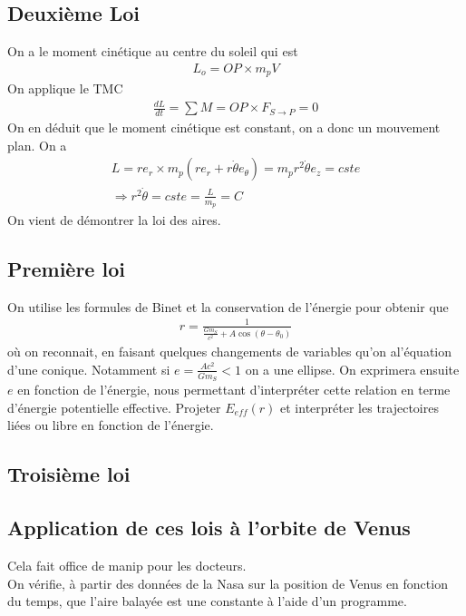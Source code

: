 \documentclass[12pt,prb,aps,epsf]{article}
\begin{document}
\subsection{Deuxième Loi}
On a le moment cinétique au centre du soleil qui est 
\begin{eqnarray}
L_o = OP\times m_p V
\end{eqnarray}
On applique le TMC 
\begin{eqnarray}
\frac{dL}{dt} = \sum M = OP\times F_{S\rightarrow P} = 0
\end{eqnarray}
On en déduit que le moment cinétique est constant, on a donc un mouvement plan.
On a 
\begin{eqnarray}
L = re_r \times m_p (re_r+r\dot{\theta}e_{\theta}) = m_pr^2 \dot{\theta}e_z = cste\\
\Longrightarrow r^2\dot{\theta} = cste = \frac{L}{m_p} = C
\end{eqnarray}
On vient de démontrer la loi des aires.

\subsection{Première loi}
On utilise les formules de Binet et la conservation de l'énergie pour obtenir que 
\begin{eqnarray}
r = \frac{1}{\frac{Gm_S}{c^2}+A\cos(\theta-\theta_0)}
\end{eqnarray}
où on reconnait, en faisant quelques changements de variables qu'on al'équation d'une conique. Notamment si $e =\frac{Ac^2}{Gm_S} < 1$ on a une ellipse. On exprimera ensuite $e$ en fonction de l'énergie, nous permettant d'interpréter cette relation en terme d'énergie potentielle effective. Projeter $E_{eff}(r)$ et interpréter les trajectoires liées ou libre en fonction de l'énergie.

\subsection{Troisième loi}

\subsection{Application de ces lois à l'orbite de Venus}
Cela fait office de manip pour les docteurs.\\
On vérifie, à partir des données de la Nasa sur la position de Venus en fonction du temps, que l'aire balayée est une constante à l'aide d'un programme.
\end{document}
